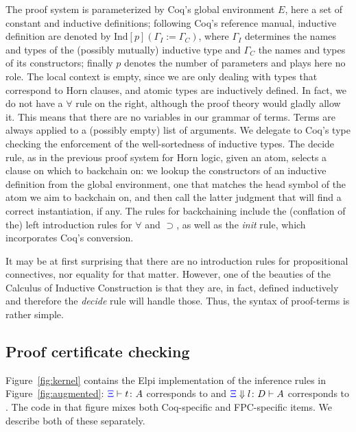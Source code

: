 The proof system is parameterized by Coq's global environment $E$,
here a set of constant and inductive definitions; following Coq's
reference manual, inductive definition are denoted by
$\mathrm{Ind}[p] (\Gamma_I := \Gamma_C)$, where $\Gamma_I$ determines
the names and types of the (possibly mutually) inductive type and
$\Gamma_C$ the names and types of its constructors; finally $p$
denotes the number of parameters and plays here no role. The {local context} is empty, since we are only
dealing with types that correspond to Horn clauses, and atomic types
are inductively defined. In fact, we do not have a $\forall$ rule on
the right, although the proof theory would gladly allow it. This means
that there are no variables in our grammar of
terms. Terms are always applied to a (possibly empty) list of
arguments.   We delegate to
Coq's type checking the enforcement of the well-sortedness of
inductive types.  The {decide} rule, %
as in the previous proof system for Horn logic,  given an atom,
 selects a clause on which to backchain on: we lookup the
constructors of an inductive definition from the global
environment, one that matches the head symbol of the atom we aim to backchain on, and then
call the latter judgment that will find a correct instantiation, if any. The rules for backchaining include
 the (conflation of the) left introduction rules for
$\forall$ and $\supset$, as well as the \emph{init} rule, which incorporates Coq's conversion.

It may be at first surprising that there are no
introduction rules for propositional connectives, nor equality for
that matter. However, one of the beauties of the Calculus of Inductive
Construction is that they are, in fact, defined inductively and
therefore the \emph{decide} rule will handle those.  Thus, the syntax
of proof-terms is rather simple.

\subsection{Proof certificate checking}
\label{ssec:cert}
Figure~\ref{fig:kernel} contains the Elpi implementation of the
inference rules in Figure~\ref{fig:augmented}: ${\color{blue}{\Xi}}\vdash t \colon A$ corresponds to
 and ${\color{blue}{\Xi}} \Downarrow  l \colon D\vdash A$ corresponds to
.
%
The code in that figure mixes both Coq-specific and
FPC-specific items.  We describe both of these separately.

